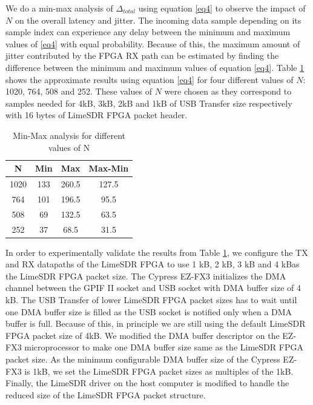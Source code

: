 We do a min-max analysis of $\Delta_{total}$ using equation \ref{eq4} to observe the impact of $N$ on the overall latency and jitter.
The incoming data sample depending on its sample index can experience any delay between the minimum and maximum values of \ref{eq4} with equal probability.
Because of this, the maximum amount of jitter contributed by the FPGA RX path can be estimated by finding the difference between the minimum and maximum values of equation \ref{eq4}.
Table \ref{min-max} shows the approximate results using  equation \ref{eq4} for four different values of $N$: 1020, 764, 508 and 252.
These values of $N$ were chosen as they correspond to samples needed for 4kB, 3kB, 2kB and 1kB of USB Transfer size respectively with 16 bytes of LimeSDR FPGA packet header.\\
\begin{table}[h]
\centering
\begin{tabular}{ c c c c }
N &  Min & Max & Max-Min\\
\hline
1020 & 133  & 260.5 & 127.5 \\
764 & 101  & 196.5 & 95.5 \\
508 & 69 & 132.5 & 63.5 \\
252 & 37 & 68.5 & 31.5 \\
\end{tabular}
\caption{Min-Max analysis for different values of N}
    \label{min-max}
\end{table}


In order to experimentally validate the results from Table \ref{min-max}, we configure the TX and RX datapaths of the LimeSDR \ac{FPGA} to use 1 kB, 2 kB, 3 kB and 4 kBas the LimeSDR FPGA packet size.
The Cypress EZ-FX3 initializes the DMA channel between the GPIF II socket and USB socket with \ac{DMA} buffer size of 4 kB.
The USB Transfer of lower LimeSDR FPGA packet sizes has to wait until one DMA buffer size is filled as the USB socket is notified only when a DMA buffer is full.
Because of this, in principle we are still using the default LimeSDR FPGA packet size of 4kB.
We modified the DMA buffer descriptor on the EZ-FX3 microprocessor to make one DMA buffer size same as the LimeSDR FPGA packet size.
As the minimum configurable DMA buffer size of the Cypress EZ-FX3 is 1kB, we set the LimeSDR FPGA packet sizes as multiples of the 1kB.
Finally, the LimeSDR driver on the host computer is modified to handle the reduced size of the LimeSDR FPGA packet structure.

